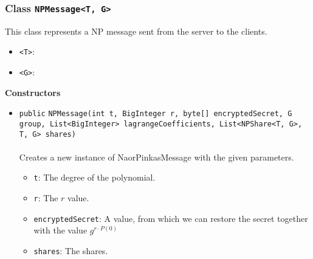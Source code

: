 \subsubsection{Class \lstinline|NPMessage<T, G>|}
This class represents a NP message sent from the
 server to the clients. \\
\noindent\begin{minipage}[t]{5cm}
\vspace{0.3em}
\hspace*{2em}
\vspace{0.3em}
\end{minipage}

\begin{itemize}
\item \lstinline|<T>|: 
\item \lstinline|<G>|: 
\end{itemize}



\textbf{\sffamily Constructors}
\begin{itemize}
\item \lstinline|public| \lstinline|NPMessage|\lstinline|(int t, BigInteger r, byte[] encryptedSecret, G group, List<BigInteger> lagrangeCoefficients, List<NPShare<T, G>, T, G> shares)|\\ \\[-0.6em]
Creates a new instance of NaorPinkasMessage with the given parameters.
\begin{itemize}
\item \lstinline|t|: The degree of the polynomial.
\item \lstinline|r|: The $r$ value.
\item \lstinline|encryptedSecret|: A value, from which we can restore the secret
                        together with the value $g^{r \cdot P(0)}$
\item \lstinline|shares|: The shares.
\end{itemize}



\end{itemize}


